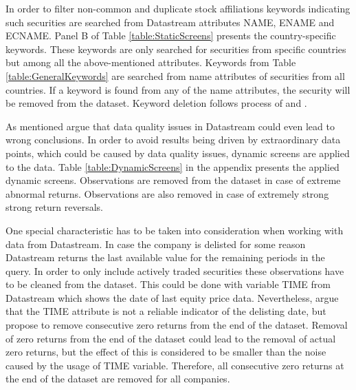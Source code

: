 \documentclass[12pt]{article}
\begin{document}
In order to filter non-common and duplicate stock affiliations keywords indicating such securities are searched from Datastream attributes NAME, ENAME and ECNAME. Panel B of Table \ref{table:StaticScreens} presents the country-specific keywords. These keywords are only searched for securities from specific countries but among all the above-mentioned attributes. Keywords from Table \ref{table:GeneralKeywords} are searched from name attributes of securities from all countries. If a keyword is found from any of the name attributes, the security will be removed from the dataset. Keyword deletion follows process of \citet{Ince2006} and \citet{HANAUER2023106712}.\footnotemark {} \par

As mentioned \citet{Ince2006} argue that data quality issues in Datastream could even lead to wrong conclusions.\footnotemark {} In order to avoid results being driven by extraordinary data points, which could be caused by data quality issues, dynamic screens are applied to the data. Table \ref{table:DynamicScreens} in the appendix presents the applied dynamic screens. Observations are removed from the dataset in case of extreme abnormal returns. Observations are also removed in case of extremely strong strong return reversals.\par

One special characteristic has to be taken into consideration when working with data from Datastream. In case the company is delisted for some reason Datastream returns the last available value for the remaining periods in the query. In order to only include actively traded securities these observations have to be cleaned from the dataset. This could be done with variable TIME from Datastream which shows the date of last equity price data. Nevertheless, \citet{Ince2006} argue that the TIME attribute is not a reliable indicator of the delisting date, but propose to remove consecutive zero returns from the end of the dataset. Removal of zero returns from the end of the dataset could lead to the removal of actual zero returns, but the effect of this is considered to be smaller than the noise caused by the usage of TIME variable.\footnotemark {} Therefore, all consecutive zero returns at the end of the dataset are removed for all companies. \par
\end{document}
